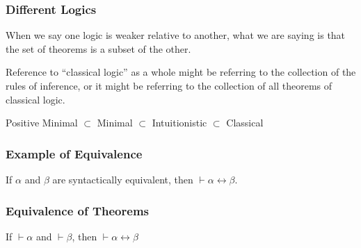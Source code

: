 \documentclass{beamer}
\begin{document}
\begin{frame}
	\frametitle{Different Logics}

	When we say one logic is weaker relative to another, what we are saying is that the set of theorems is a subset of the other. 

	\vspace{0.5cm}

	Reference to ``classical logic'' as a whole might be referring to the collection of the rules of inference, or it might be referring to the collection of all theorems of classical logic. 

	\vspace{0.5cm}

	\begin{center}
	Positive Minimal $\subset$ Minimal $\subset$ Intuitionistic $\subset$ Classical
	\end{center}

\end{frame}








\begin{frame}
	\frametitle{Example of Equivalence}	
	
	If $\alpha$ and $\beta$ are syntactically equivalent, then $\vdash \alpha \leftrightarrow \beta$. 
	
	\vspace{7cm}
	
\end{frame}

\begin{frame}
	\frametitle{Equivalence of Theorems}
	
	If $\vdash \alpha$ and $\vdash \beta$, then $\vdash \alpha \leftrightarrow \beta$
	
	\vspace{7cm}
	
\end{frame}
\end{document}

